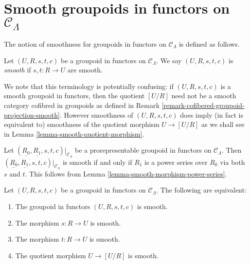 \section{Smooth groupoids in functors on $\mathcal{C}_\Lambda$}
\label{section-smooth-minimal-groupoids-in-functors}

\noindent
The notion of smoothness for groupoids in functors on $\mathcal{C}_\Lambda$ is
defined as follows.

\begin{definition}
\label{definition-smooth-groupoid-in-functors}
Let $(U, R, s,t,c)$ be a groupoid in functors on $\mathcal{C}_\Lambda$. We
say $(U, R, s,t,c)$ is {\it smooth} if $s,t: R \to U$ are smooth.
\end{definition}

\begin{remark}
\label{remark-smooth-groupoid-in-functors-warning}
We note that this terminology is potentially confusing:
if $(U, R, s, t, c)$ is a smooth groupoid in functors, then the quotient
$[U/R]$ need not be a smooth category cofibred in groupoids as defined in
Remark \ref{remark-cofibered-groupoid-projection-smooth}.
However smoothness of $(U, R, s, t, c)$ does imply (in fact is equivalent to)
smoothness of the quotient morphism $U \to [U/R]$ as we shall
see in
Lemma \ref{lemma-smooth-quotient-morphism}.
\end{remark}

\begin{remark}
\label{remark-smooth-power-series-prorepresentable-smooth-groupoid-in-functors}
Let $(\underline{R_0}, \underline{R_1}, s,t,c)|_{\mathcal{C}_\Lambda}$
be a prorepresentable groupoid in functors on $\mathcal{C}_\Lambda$.
Then $(\underline{R_0}, \underline{R_1}, s,t,c)|_{\mathcal{C}_\Lambda}$
is smooth if and only if $R_1$ is a power series over $R_0$ via both $s$
and $t$. This follows from
Lemma \ref{lemma-smooth-morphism-power-series}.
\end{remark}

\begin{lemma}
\label{lemma-smooth-quotient-morphism}
Let $(U, R, s, t, c)$ be a groupoid in functors on $\mathcal{C}_\Lambda$.
The following are equivalent: 
\begin{enumerate}
\item The groupoid in functors $(U, R, s, t, c)$ is smooth.
\item The morphism $s : R \to U$ is smooth.
\item The morphism $t : R \to U$ is smooth.
\item The quotient morphism $U \to [U/R]$ is smooth.
\end{enumerate}
\end{lemma}

